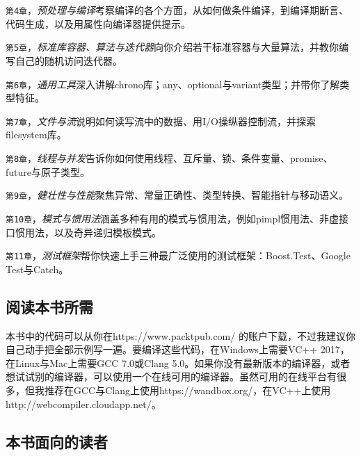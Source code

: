 
\texttt{第4章}，\textit{预处理与编译}考察编译的各个方面，从如何做条件编译，到编译期断言、代码生成，以及用属性向编译器提供提示。



\texttt{第5章}，\textit{标准库容器、算法与迭代器}向你介绍若干标准容器与大量算法，并教你编写自己的随机访问迭代器。



\texttt{第6章}，\textit{通用工具}深入讲解chrono库；any、optional与variant类型；并带你了解类型特征。



\texttt{第7章}，\textit{文件与流}说明如何读写流中的数据、用I/O操纵器控制流，并探索filesystem库。



\texttt{第8章}，\textit{线程与并发}告诉你如何使用线程、互斥量、锁、条件变量、promise、future与原子类型。



\texttt{第9章}，\textit{健壮性与性能}聚焦异常、常量正确性、类型转换、智能指针与移动语义。



\texttt{第10章}，\textit{模式与惯用法}涵盖多种有用的模式与惯用法，例如pimpl惯用法、非虚接口惯用法，以及奇异递归模板模式。



\texttt{第11章}，\textit{测试框架}帮你快速上手三种最广泛使用的测试框架：Boost.Test、Google Test与Catch。



\subsection*{阅读本书所需}



本书中的代码可以从你在https://\allowbreak{}www.\allowbreak{}packtpub.\allowbreak{}com/ 的账户下载，不过我建议你自己动手把全部示例写一遍。要编译这些代码，在Windows上需要VC++ 2017，在Linux与Mac上需要GCC 7.0或Clang 5.0。如果你没有最新版本的编译器，或者想试试别的编译器，可以使用一个在线可用的编译器。虽然可用的在线平台有很多，但我推荐在GCC与Clang上使用https://\allowbreak{}wandbox.\allowbreak{}org/\allowbreak{}，在VC++上使用http://\allowbreak{}webcompiler.\allowbreak{}cloudapp.\allowbreak{}net/\allowbreak{}。



\subsection*{本书面向的读者}


